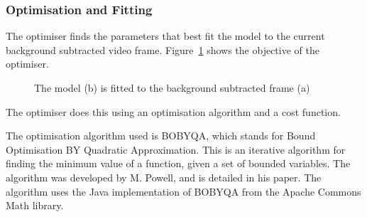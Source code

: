 \pagebreak
\subsubsection{Optimisation and Fitting}

The optimiser finds the parameters that best fit the model to the current background subtracted video frame. Figure~\ref{fig:modelfit} shows the objective of the optimiser.

\begin{figure}[H]
    \centering
\caption{The model (b) is fitted to the background subtracted frame (a)}
\label{fig:modelfit}
\end{figure}

The optimiser does this using an optimisation algorithm and a cost function.

The optimisation algorithm used is BOBYQA, which stands for Bound Optimisation BY Quadratic Approximation. This is an iterative algorithm for finding the minimum value of a function, given a set of bounded variables. The algorithm was developed by M. Powell, and is detailed in his paper\cite{bobyqa}. The algorithm uses the Java implementation of BOBYQA from the Apache Commons Math library\cite{apachemath}.

